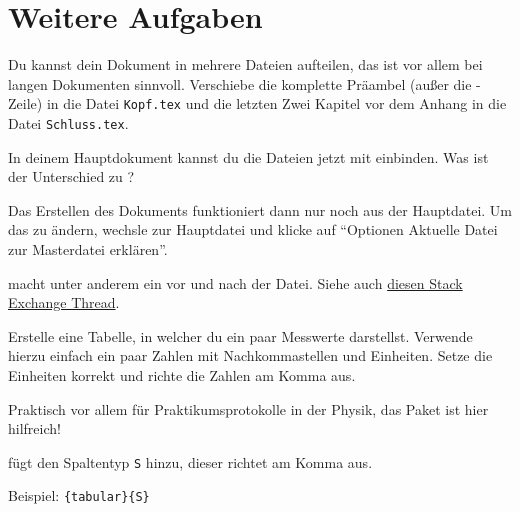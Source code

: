 \section{Weitere Aufgaben}
    \begin{uebung}
        \item Du kannst dein Dokument in mehrere Dateien aufteilen, das ist vor
        allem bei langen Dokumenten sinnvoll. Verschiebe die komplette Präambel
        (außer die -Zeile) in die Datei \texttt{Kopf.tex} und
        die letzten Zwei Kapitel vor dem Anhang in die Datei \texttt{Schluss.tex}.

        In deinem Hauptdokument kannst du die Dateien jetzt mit
         einbinden. Was ist der Unterschied zu
        ?
            \begin{hinweis}
                Das Erstellen des Dokuments funktioniert dann nur noch aus der Hauptdatei.
                Um das zu ändern, wechsle zur Hauptdatei und klicke auf
                \enquote{Optionen \textrightarrow{} Aktuelle Datei zur Masterdatei erklären}.
            \end{hinweis}
            \begin{loesung}
                 macht unter anderem ein  vor und nach
                der Datei. Siehe auch \href{http://tex.stackexchange.com/questions/246/when-should-i-use-input-vs-include}{diesen Stack Exchange Thread}.
            \end{loesung}

        \item Erstelle eine Tabelle, in welcher du ein paar Messwerte darstellst.
            Verwende hierzu einfach ein paar Zahlen mit Nachkommastellen und Einheiten.
            Setze die Einheiten korrekt und richte die Zahlen am Komma aus.
            \begin{hinweis}
                Praktisch vor allem für Praktikumsprotokolle in der Physik, das Paket  ist
                hier hilfreich!
            \end{hinweis}
            \begin{loesung}
            	 fügt den Spaltentyp \texttt{S} hinzu, dieser richtet am Komma aus.
            	
            	Beispiel: \verb|{tabular}{S}|
            \end{loesung}


\end{uebung}
